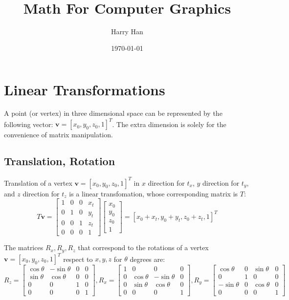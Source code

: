 \documentclass[12pt, a4paper]{article}
\title{Math For Computer Graphics}
\author{Harry Han}
\date{\today}
\theoremstyle{definition}
\theoremstyle{remark}
\begin{document}
\maketitle
\section{Linear Transformations}

A point (or vertex) in three dimensional space can be represented by the following vector: $\bm{v}=[x_0, y_0 ,z_0, 1]^{T}$. The extra dimension is solely for the convenience of matrix manipulation.

\subsection{Translation, Rotation}

Translation of a vertex $\bm{v}=[x_0, y_0,z_0, 1]^T$ in $x$ direction for $t_x$, $y$ direction for $t_y$, and $z$ direction for $t_z$ is a linear transfomation, whose corresponding matrix is $T$:
\begin{equation}\label{eq:translation}
	T\bm{v} = 
	\begin{bmatrix}
	1 & 0 & 0 & x_t\\
	0 & 1 & 0 & y_t\\
	0 & 0 & 1 & z_t\\
	0 & 0 & 0 & 1
	\end{bmatrix} 
	\begin{bmatrix}
	x_0\\
	y_0\\
	z_0\\
	1
	\end{bmatrix}
	= [x_0 + x_t, y_0 + y_t, z_0 + z_t, 1]^T
\end{equation}

The matrices $R_x, R_y, R_z$ that correspond to the rotations of a vertex $\bm{v}=[x_0, y_0, z_0, 1]^T$ respect to $x, y, z$ for $\theta$ degrees are:
\begingroup
\fontsize{10}{12}\selectfont
\begin{equation}\label{eq:rotation}
	R_z = 
	\begin{bmatrix}
	\cos{\theta} & -\sin{\theta} & 0 & 0\\
	\sin{\theta} & \cos{\theta} & 0 & 0\\
	0 & 0 & 1 & 0\\
	0 & 0 & 0 & 1
	\end{bmatrix}, 
	R_x =
	\begin{bmatrix}
	1 & 0 & 0 & 0\\
	0 & \cos{\theta} & -\sin{\theta} & 0\\
	0 & \sin{\theta} & \cos{\theta} & 0\\
	0 & 0 & 0 & 1
	\end{bmatrix}, 
	R_y =
	\begin{bmatrix}
	\cos{\theta} & 0 & \sin{\theta} & 0\\
	0 & 1 & 0 & 0\\
	-\sin{\theta} & 0 & \cos{\theta} & 0\\
	0 & 0 & 0 & 1
	\end{bmatrix}
\end{equation}
\endgroup
\end{document}
